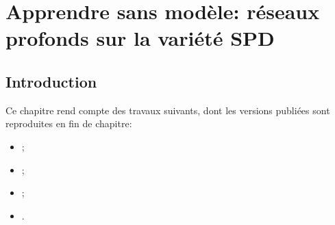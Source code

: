 \chapter{Apprendre sans modèle: réseaux profonds sur la variété SPD}
\label{ch:spdnet}

\section{Introduction}
\label{sec:spdnet-introduction}

\begin{contributions}
  Ce chapitre rend compte des travaux suivants, dont les versions publiées sont
  reproduites en fin de chapitre:
  \begin{itemize}
    \item {};
    \item {};
    \item {};
    \item {}.
  \end{itemize}
\end{contributions}

